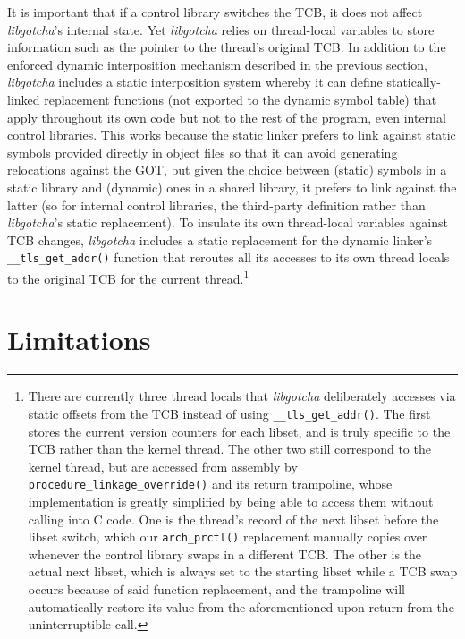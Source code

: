 It is important that if a control library switches the TCB, it does not affect
\textit{libgotcha}'s internal state.  Yet \textit{libgotcha} relies on thread-local
variables to store information such as the pointer to the thread's original TCB.  In
addition to the enforced dynamic interposition mechanism described in the previous
section, \textit{libgotcha} includes a static interposition system whereby it can
define statically-linked replacement functions (not exported to the dynamic symbol
table) that apply throughout its own code but not to the rest of the program, even
internal control libraries.  This works because the static linker prefers to link
against static symbols provided directly in object files so that it can avoid
generating relocations against the GOT, but given the choice between (static) symbols
in a static library and (dynamic) ones in a shared library, it prefers to link
against the latter (so for internal control libraries, the third-party definition
rather than \textit{libgotcha}'s static replacement).  To insulate its own
thread-local variables against TCB changes, \textit{libgotcha} includes a static
replacement for the dynamic linker's \texttt{\_\_tls\_get\_addr()} function that
reroutes all its accesses to its own thread locals to the original TCB for the
current thread.\footnote{There are currently three thread locals that
\textit{libgotcha} deliberately accesses via static offsets from the TCB instead of
using \texttt{\_\_tls\_get\_addr()}.  The first stores the current version counters
for each libset, and is truly specific to the TCB rather than the kernel thread.  The
other two still correspond to the kernel thread, but are accessed from assembly by
\texttt{procedure\_linkage\_override()} and its return trampoline, whose
implementation is greatly simplified by being able to access them without calling
into C code.  One is the thread's record of the next libset before the libset switch,
which our \texttt{arch\_prctl()} replacement manually copies over whenever the
control library swaps in a different TCB.  The other is the actual next libset, which
is always set to the starting libset while a TCB swap occurs because of said
function replacement, and the trampoline will automatically restore its value from
the aforementioned upon return from the uninterruptible call.}


\section{Limitations}

